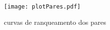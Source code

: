\begin{figure}[!h]
   \setlength{\unitlength}{1.0cm}
   \centering
     \texttt{[image: plotPares.pdf]}
   \caption{curvas de ranqueamento dos pares}
   \label{plotPares}
\end{figure}


% 
% 
% 
